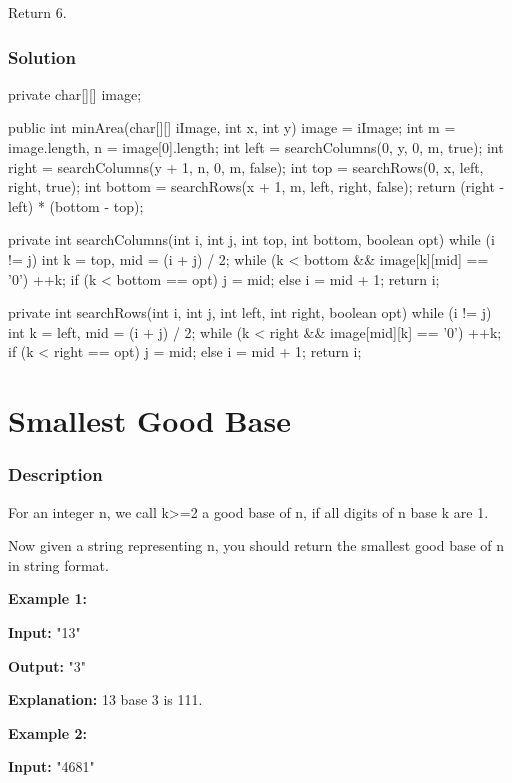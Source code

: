 Return 6.
\subsubsection{Solution}

\begin{Code}
private char[][] image;

public int minArea(char[][] iImage, int x, int y) {
    image = iImage;
    int m = image.length, n = image[0].length;
    int left = searchColumns(0, y, 0, m, true);
    int right = searchColumns(y + 1, n, 0, m, false);
    int top = searchRows(0, x, left, right, true);
    int bottom = searchRows(x + 1, m, left, right, false);
    return (right - left) * (bottom - top);
}

private int searchColumns(int i, int j, int top, int bottom, boolean opt) {
    while (i != j) {
        int k = top, mid = (i + j) / 2;
        while (k < bottom && image[k][mid] == '0') ++k;
        if (k < bottom == opt)
            j = mid;
        else
            i = mid + 1;
    }
    return i;
}

private int searchRows(int i, int j, int left, int right, boolean opt) {
    while (i != j) {
        int k = left, mid = (i + j) / 2;
        while (k < right && image[mid][k] == '0') ++k;
        if (k < right == opt)
            j = mid;
        else
            i = mid + 1;
    }
    return i;
}
\end{Code}

\newpage

\section{Smallest Good Base} %

\subsubsection{Description}
For an integer n, we call k>=2 a good base of n, if all digits of n base k are 1.

Now given a string representing n, you should return the smallest good base of n in string format.

\textbf{Example 1:}

\textbf{Input:} "13"

\textbf{Output:} "3"

\textbf{Explanation:} 13 base 3 is 111.

\textbf{Example 2:}

\textbf{Input:} "4681"

